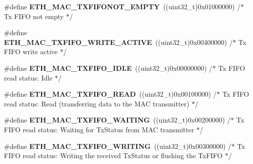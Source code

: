 \begin{DoxyCompactItemize}
\item 
\hypertarget{group___h_a_l___e_t_h___aliased___defines_ga4c428a862f392d95b5dd889e8cd96924}{\#define {\bfseries E\-T\-H\-\_\-\-M\-A\-C\-\_\-\-T\-X\-F\-I\-F\-O\-N\-O\-T\-\_\-\-E\-M\-P\-T\-Y}~((uint32\-\_\-t)0x01000000)  /$\ast$ Tx F\-I\-F\-O not empty $\ast$/}\label{group___h_a_l___e_t_h___aliased___defines_ga4c428a862f392d95b5dd889e8cd96924}

\item 
\hypertarget{group___h_a_l___e_t_h___aliased___defines_gaff6cebd747512114367fa01ef36e0394}{\#define {\bfseries E\-T\-H\-\_\-\-M\-A\-C\-\_\-\-T\-X\-F\-I\-F\-O\-\_\-\-W\-R\-I\-T\-E\-\_\-\-A\-C\-T\-I\-V\-E}~((uint32\-\_\-t)0x00400000)  /$\ast$ Tx F\-I\-F\-O write active $\ast$/}\label{group___h_a_l___e_t_h___aliased___defines_gaff6cebd747512114367fa01ef36e0394}

\item 
\hypertarget{group___h_a_l___e_t_h___aliased___defines_ga36e9938d6f099aab9f801d547d0a88a5}{\#define {\bfseries E\-T\-H\-\_\-\-M\-A\-C\-\_\-\-T\-X\-F\-I\-F\-O\-\_\-\-I\-D\-L\-E}~((uint32\-\_\-t)0x00000000)  /$\ast$ Tx F\-I\-F\-O read status\-: Idle $\ast$/}\label{group___h_a_l___e_t_h___aliased___defines_ga36e9938d6f099aab9f801d547d0a88a5}

\item 
\hypertarget{group___h_a_l___e_t_h___aliased___defines_ga162f3eb163f0fc63e0ef21f640ee3b35}{\#define {\bfseries E\-T\-H\-\_\-\-M\-A\-C\-\_\-\-T\-X\-F\-I\-F\-O\-\_\-\-R\-E\-A\-D}~((uint32\-\_\-t)0x00100000)  /$\ast$ Tx F\-I\-F\-O read status\-: Read (transferring data to the M\-A\-C transmitter) $\ast$/}\label{group___h_a_l___e_t_h___aliased___defines_ga162f3eb163f0fc63e0ef21f640ee3b35}

\item 
\hypertarget{group___h_a_l___e_t_h___aliased___defines_ga732d203562136a49e6fdfe08cbbdb007}{\#define {\bfseries E\-T\-H\-\_\-\-M\-A\-C\-\_\-\-T\-X\-F\-I\-F\-O\-\_\-\-W\-A\-I\-T\-I\-N\-G}~((uint32\-\_\-t)0x00200000)  /$\ast$ Tx F\-I\-F\-O read status\-: Waiting for Tx\-Status from M\-A\-C transmitter $\ast$/}\label{group___h_a_l___e_t_h___aliased___defines_ga732d203562136a49e6fdfe08cbbdb007}

\item 
\hypertarget{group___h_a_l___e_t_h___aliased___defines_gaa98e266d20386f08f1e7d07924ae7fd8}{\#define {\bfseries E\-T\-H\-\_\-\-M\-A\-C\-\_\-\-T\-X\-F\-I\-F\-O\-\_\-\-W\-R\-I\-T\-I\-N\-G}~((uint32\-\_\-t)0x00300000)  /$\ast$ Tx F\-I\-F\-O read status\-: Writing the received Tx\-Status or flushing the Tx\-F\-I\-F\-O $\ast$/}\label{group___h_a_l___e_t_h___aliased___defines_gaa98e266d20386f08f1e7d07924ae7fd8}


\end{DoxyCompactItemize}
